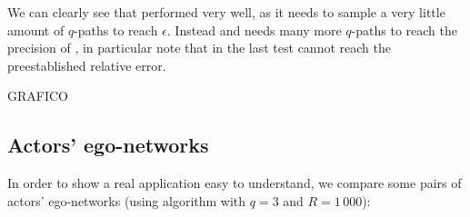 	
	We can clearly see that \fcount performed very well, as it needs to sample a very little amount of $q$-paths to reach $\epsilon$.
	Instead \fsamp and \base needs many more $q$-paths to reach the precision of \fcount, in particular note that in the last test \base cannot reach the preestablished relative error.\medskip
	
	GRAFICO
	
\clearpage
	

	

	\subsection*{Actors' ego-networks}
	
	In order to show a real application easy to understand, we compare
	some pairs of actors' ego-networks (using \fcount algorithm with $q=3$ and $R=1\,000$):
	
